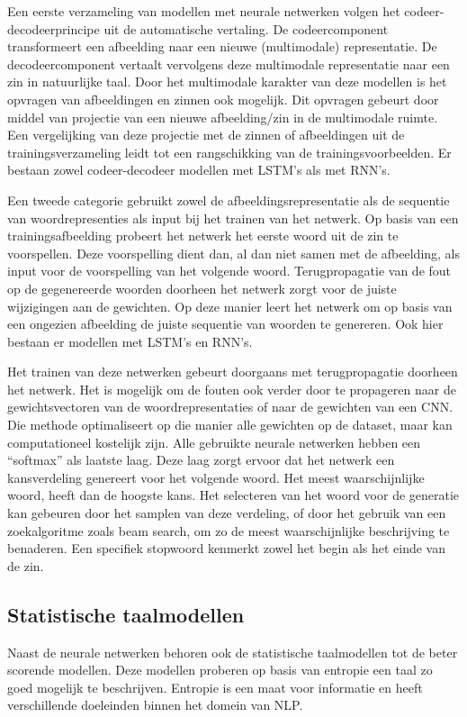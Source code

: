 Een eerste verzameling van modellen met neurale netwerken volgen het codeer-decodeerprincipe uit de automatische vertaling\cite{Kiros2014}. De codeercomponent transformeert een afbeelding naar een nieuwe (multimodale) representatie. De decodeercomponent vertaalt vervolgens deze multimodale representatie naar een zin in natuurlijke taal. Door het multimodale karakter van deze modellen is het opvragen van afbeeldingen en zinnen ook mogelijk. Dit opvragen gebeurt door middel van projectie van een nieuwe afbeelding/zin in de multimodale ruimte. Een vergelijking van deze projectie met de zinnen of afbeeldingen uit de trainingsverzameling leidt tot een rangschikking van de trainingsvoorbeelden. Er bestaan zowel codeer-decodeer modellen met LSTM's\cite{Kiros2014} als met RNN's\cite{Karpathy2014,Mao2014a}.

Een tweede categorie gebruikt zowel de afbeeldingsrepresentatie als de sequentie van 
woordrepresenties als input bij het trainen van het netwerk. Op basis van een trainingsafbeelding probeert het netwerk het eerste woord uit de zin te voorspellen. Deze voorspelling dient dan, al dan niet samen met de afbeelding, als input voor de voorspelling van het volgende woord. Terugpropagatie van de fout op de gegenereerde woorden doorheen het netwerk zorgt voor de juiste wijzigingen aan de gewichten. Op deze manier leert het netwerk om op basis van een ongezien afbeelding de juiste sequentie van woorden te genereren. Ook hier bestaan er modellen met LSTM's\cite{Donahue2015,Google} en RNN's\cite{Karpathy2015}. 

Het trainen van deze netwerken gebeurt doorgaans met terugpropagatie doorheen het netwerk. Het is mogelijk om de fouten ook verder door te propageren naar de gewichtsvectoren van de woordrepresentaties of naar de gewichten van een CNN. Die methode optimaliseert op die manier alle gewichten op de dataset, maar kan computationeel kostelijk zijn.
Alle  gebruikte neurale netwerken hebben een ``softmax'' als laatste laag. Deze laag zorgt ervoor dat het netwerk een kansverdeling genereert voor het volgende woord. Het meest waarschijnlijke woord, heeft dan de hoogste kans.
Het selecteren van het woord voor de generatie kan gebeuren door het samplen van deze verdeling, of door het gebruik van een zoekalgoritme zoals beam search, om zo de meest waarschijnlijke beschrijving te benaderen. Een specifiek stopwoord kenmerkt zowel het begin als het einde van de zin.

\subsection{Statistische taalmodellen}
Naast de neurale netwerken behoren ook de statistische taalmodellen tot de beter scorende modellen. Deze modellen proberen op basis van entropie een taal zo goed mogelijk te beschrijven. Entropie is een maat voor informatie en heeft verschillende doeleinden binnen het domein van NLP. 

